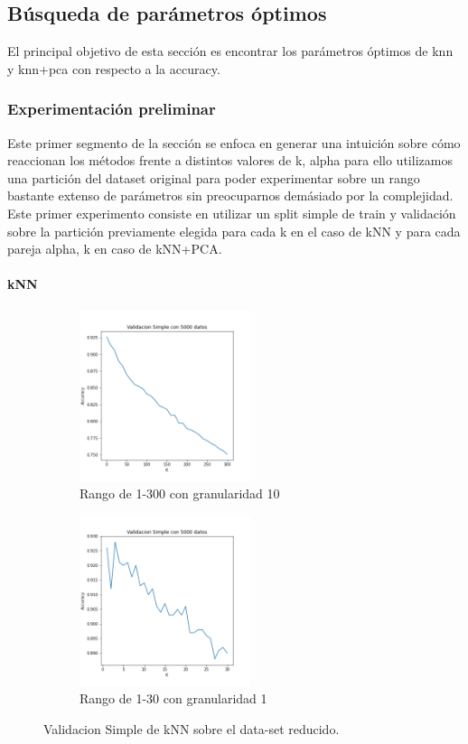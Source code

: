 
\subsection{Búsqueda de parámetros óptimos }

El principal objetivo de esta sección es encontrar los parámetros óptimos de knn y knn+pca con respecto a la accuracy. 

\subsubsection{Experimentación preliminar}
Este primer segmento de la sección se enfoca en generar una intuición sobre cómo reaccionan los métodos frente a distintos valores de k, alpha para ello utilizamos una partición del dataset original para poder experimentar sobre un rango bastante extenso de parámetros sin preocuparnos demásiado por la complejidad. Este primer experimento consiste en utilizar un split simple de train y validación sobre la partición previamente elegida para cada k en el caso de kNN y para cada pareja alpha, k en caso de kNN+PCA. 

\paragraph{kNN}

\begin{figure}[h]
\begin{subfigure}{0.5\textwidth}
\includegraphics[width=0.9\linewidth, height=5cm]{images/validacionSimple_knnsolo.png} 
\caption{Rango de 1-300 con granularidad 10}
\label{fig:subimbar_medio1}
\end{subfigure}
\begin{subfigure}{0.5\textwidth}
\includegraphics[width=0.9\linewidth, height=5cm]{images/validacionSimple_knnsolo_Kchicos.png} 
\caption{Rango de 1-30 con granularidad 1}
\label{fig:subimbar_medio2}
\end{subfigure}
\caption{Validacion Simple de kNN sobre el data-set reducido.}
\label{knn_preliminar}%
\end{figure}

